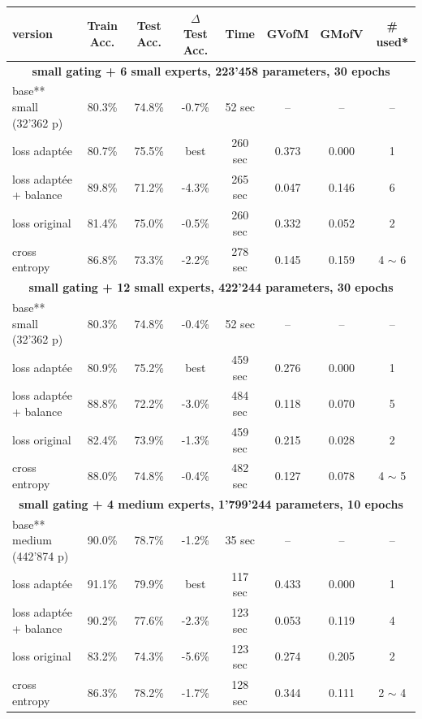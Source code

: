 \documentclass{article}
\begin{document}
\begin{table}[t]
\centering
\setlength{\tabcolsep}{6pt}
\renewcommand{\arraystretch}{1.15}
\begin{tabular*}{\textwidth}{@{\extracolsep{\fill}} | l | c c c c | c c | c |}
\hline
\textbf{version} &
\textbf{Train Acc.} & \textbf{Test Acc.} & \textbf{$\Delta$ Test Acc.} & \textbf{Time} &
\textbf{GVofM} & \textbf{GMofV} & \textbf{\# used*} \\
\hline

\multicolumn{8}{|c|}{\textbf{small gating + 6 small experts, 223'458 parameters, 30 epochs}} \\
\hline
base** small (32'362 p)        & 80.3\% & 74.8\% & -0.7\% &  52 sec  & --    & --    & -- \\
loss adaptée                 & 80.7\% & 75.5\% & best & 260 sec  & 0.373 & 0.000 & 1  \\
loss adaptée + balance       & 89.8\% & 71.2\% & -4.3\% & 265 sec  & 0.047 & 0.146 & 6  \\
loss original                & 81.4\% & 75.0\% & -0.5\% & 260 sec  & 0.332 & 0.052 & 2  \\
cross entropy                 & 86.8\% & 73.3\% & -2.2\% & 278 sec  & 0.145 & 0.159 & 4 $\sim$ 6 \\
\hline

\multicolumn{8}{|c|}{\textbf{small gating + 12 small experts, 422'244 parameters, 30 epochs}} \\
\hline
base** small (32'362 p)        & 80.3\% & 74.8\% & -0.4\% &  52 sec  & --    & --    & -- \\
loss adaptée                 & 80.9\% & 75.2\% & best & 459 sec  & 0.276 & 0.000 & 1  \\
loss adaptée + balance       & 88.8\% & 72.2\% & -3.0\% & 484 sec  & 0.118 & 0.070 & 5  \\
loss original                & 82.4\% & 73.9\% & -1.3\% & 459 sec  & 0.215 & 0.028 & 2  \\
cross entropy                 & 88.0\% & 74.8\% & -0.4\% & 482 sec  & 0.127 & 0.078 & 4 $\sim$ 5 \\
\hline

\multicolumn{8}{|c|}{\textbf{small gating + 4 medium experts, 1'799'244 parameters, 10 epochs}} \\
\hline
base** medium (442'874 p)      & 90.0\% & 78.7\% & -1.2\% &  35 sec  & --    & --    & -- \\
loss adaptée                 & 91.1\% & 79.9\% & best & 117 sec  & 0.433 & 0.000 & 1  \\
loss adaptée + balance       & 90.2\% & 77.6\% & -2.3\% & 123 sec  & 0.053 & 0.119 & 4  \\
loss original                & 83.2\% & 74.3\% & -5.6\% & 123 sec  & 0.274 & 0.205 & 2  \\
cross entropy                 & 86.3\% & 78.2\% & -1.7\% & 128 sec  & 0.344 & 0.111 & 2 $\sim$ 4 \\
\hline
\end{tabular*}


\end{table}
\end{document}
